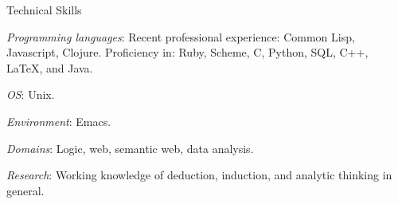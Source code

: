 \begin{rubric}{Technical Skills}{


  \entry* \emph{Programming languages}: Recent professional
  experience:  Common Lisp, Javascript, Clojure. Proficiency in:
  Ruby, Scheme, C, Python, SQL, C++, \LaTeX{}, and Java.

  \entry* \emph{OS}: Unix.

  \entry* \emph{Environment}: Emacs.

  \entry* \emph{Domains}: Logic, web, semantic web, data analysis.

  \entry* \emph{Research}: Working knowledge of deduction, induction,
  and analytic thinking in general.

}\end{rubric}
